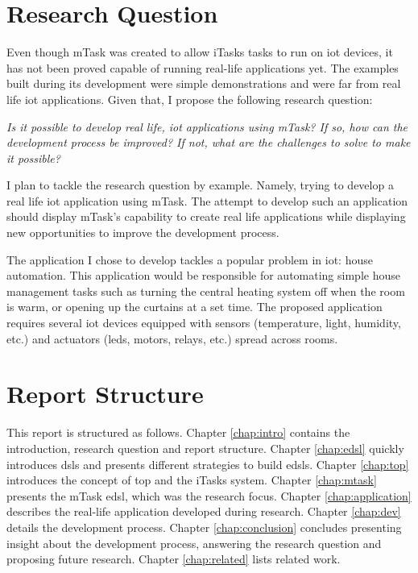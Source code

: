 \section{Research Question}
Even though mTask was created to allow iTasks tasks to run on \acs{iot} devices, it has not been proved capable of running real-life applications yet. The examples built during its development were simple demonstrations and were far from real life \acs{iot} applications. Given that, I propose the following research question:
\begin{center}
\emph{Is it possible to develop real life, \acs{iot} applications using mTask? If so, how can the development process be improved? If not, what are the challenges to solve to make it possible?}
\end{center}
I plan to tackle the research question by example. Namely, trying to develop a real life \acs{iot} application using mTask. The attempt to develop such an application should display mTask's capability to create real life applications while displaying new opportunities to improve the development process.

The application I chose to develop tackles a popular problem in \acrshort{iot}: house automation. This application would be responsible for automating simple house management tasks such as turning the central heating system off when the room is warm, or opening up the curtains at a set time. The proposed application requires several \acrshort{iot} devices equipped with sensors (temperature, light, humidity, etc.) and actuators (\acsp{led}, motors, relays, etc.) spread across rooms. 


\section{Report Structure}

This report is structured as follows. Chapter \ref{chap:intro} contains the introduction, research question and report structure. Chapter \ref{chap:edsl} quickly introduces \acp{dsl} and presents different strategies to build \acp{edsl}. Chapter \ref{chap:top} introduces the concept of \ac{top} and the iTasks system. Chapter \ref{chap:mtask} presents the mTask \ac{edsl}, which was the research focus. Chapter \ref{chap:application} describes the real-life application developed during research. Chapter \ref{chap:dev} details the development process. Chapter \ref{chap:conclusion} concludes presenting insight about the development process, answering the research question and proposing future research. Chapter \ref{chap:related} lists related work.


